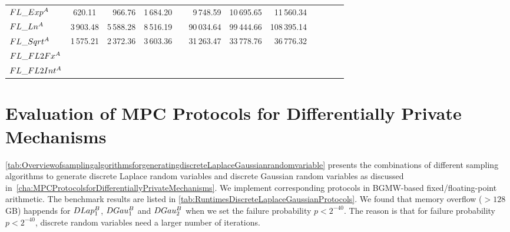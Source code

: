 \begin{table}
{\begin{tabular}{ l c r r r r r r r r r r}
            $FL\_Exp^{A}$                         & 620.11                  & 966.76    & 1\,684.20               &   & 9\,748.59  & 10\,695.65 & 11\,560.34  \\
            $FL\_Ln^{A}$                          & 3\,903.48               & 5\,588.28 & 8\,516.19               &   & 90\,034.64 & 99\,444.66 & 108\,395.14 \\
            $FL\_Sqrt^{A}$                        & 1\,575.21               & 2\,372.36 & 3\,603.36               &   & 31\,263.47 & 33\,778.76 & 36\,776.32  \\
            $FL\_FL2Fx^{A}$                       &                         &           &                         &   &            &            &             \\
            $FL\_FL2Int^{A}$                      &                         &           &                         &   &            &            &             \\
            \bottomrule
        \end{tabular}
    }
\end{table}
\FloatBarrier


\section{Evaluation of MPC Protocols for Differentially Private Mechanisms}
\label{sec:EvaluationofMPCProtocolsforDifferentiallyPrivateMechanisms}

\autoref{tab:OverviewofsamplingalgorithmsforgeneratingdiscreteLaplaceGaussianrandomvariable} presents the combinations of different sampling algorithms to generate discrete Laplace random variables and discrete Gaussian random variables as discussed in~\autoref{cha:MPCProtocolsforDifferentiallyPrivateMechanisms}. We implement corresponding protocols in BGMW-based fixed/floating-point arithmetic.
The benchmark results are listed in \autoref{tab:RuntimesDiscreteLaplaceGaussianProtocols}.
We found that memory overflow ($>128$ GB) happends for $DLap_1^{B}$, $DGau_1^{B}$ and $DGau_2^{B}$ when we set the failure probability $p<2^{-40}$.
The reason is that for failure probability $p<2^{-40}$, discrete random variables need a larger number of iterations.


